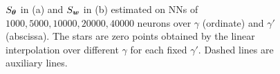\documentclass{article}
\begin{document}
\begin{figure}
    \begin{centering}
        \par\end{centering}
    \caption{$S_{\bm{\theta}}$ in (a) and $S_{\bm{w}}$ in (b) estimated on NNs of $1000,5000,10000,20000,40000$ neurons over $\gamma$ (ordinate) and $\gamma'$ (abscissa). The stars are zero points obtained by the linear interpolation over different $\gamma$ for each fixed $\gamma'$. Dashed lines are auxiliary lines.   \label{fig:theta_a_slope} }
\end{figure}
\end{document}
